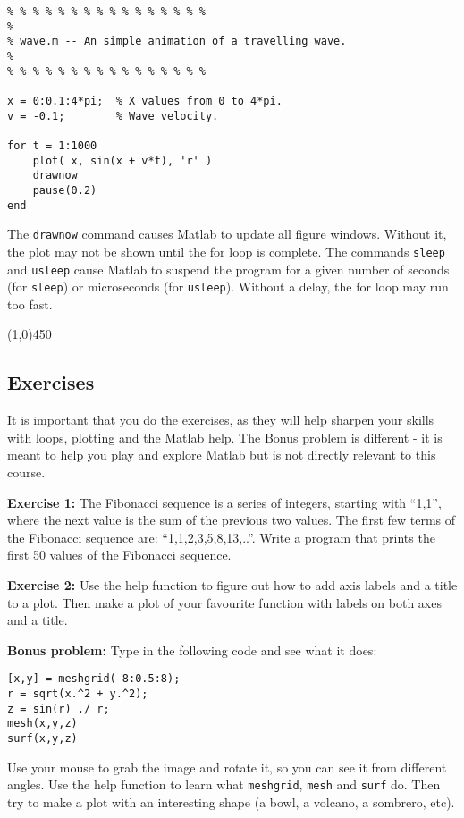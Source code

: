 \documentclass[12pt,a4paper]{article}   %
\newcommand{\code}[1]{\texttt{#1}}
\newcommand{\ruler}{
  \begin{center}
    \line(1,0){450}
  \end{center}
}
\begin{document}
\begin{verbatim}
% % % % % % % % % % % % % % % %
% 
% wave.m -- An simple animation of a travelling wave.
% 
% % % % % % % % % % % % % % % %

x = 0:0.1:4*pi;  % X values from 0 to 4*pi.
v = -0.1;        % Wave velocity.

for t = 1:1000
    plot( x, sin(x + v*t), 'r' )
    drawnow
    pause(0.2)
end
\end{verbatim}


The \code{drawnow} command causes Matlab to update all figure windows. Without it, the
plot may not be shown until the for loop is complete. The commands \code{sleep} and
\code{usleep} cause Matlab to suspend the program for a given number of seconds (for
\code{sleep}) or microseconds (for \code{usleep}). Without a delay, the for loop may
run too fast.


\ruler

\subsection{Exercises}

It is important that you do the exercises, as they will help sharpen your skills with
loops, plotting and the Matlab help. The Bonus problem is different - it is meant to
help you play and explore Matlab but is not directly relevant to this course.

\textbf{Exercise 1:} The Fibonacci sequence is a series of integers, starting with ``1,1'', where
the next value is the sum of the previous two values. The first few terms of the Fibonacci
sequence are: ``1,1,2,3,5,8,13,..''. Write a program that prints the first 50 values of the
Fibonacci sequence.

\textbf{Exercise 2:} Use the help function to figure out how to add axis labels and a title to
a plot. Then make a plot of your favourite function with labels on both axes and a title.

\textbf{Bonus problem:} Type in the following code and see what it does:

\begin{verbatim}
[x,y] = meshgrid(-8:0.5:8);
r = sqrt(x.^2 + y.^2);
z = sin(r) ./ r;
mesh(x,y,z)
surf(x,y,z)
\end{verbatim}

Use your mouse to grab the image and rotate it, so you can see it from different angles.
Use the help function to learn what \texttt{meshgrid}, \texttt{mesh} and \texttt{surf} do.
Then try to make a plot with an interesting shape (a bowl, a volcano, a sombrero, etc).

\pagebreak
\end{document}
